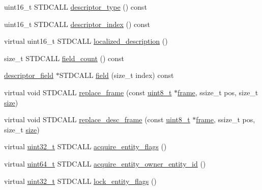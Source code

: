 \begin{DoxyCompactItemize}
\item 
uint16\+\_\+t S\+T\+D\+C\+A\+LL \hyperlink{classavdecc__lib_1_1descriptor__base__imp_aefc543029ab093823c3f5b9d84f0ccc4}{descriptor\+\_\+type} () const 
\item 
uint16\+\_\+t S\+T\+D\+C\+A\+LL \hyperlink{classavdecc__lib_1_1descriptor__base__imp_ac23c0a35276c07cfce8c8660700c2135}{descriptor\+\_\+index} () const 
\item 
virtual uint16\+\_\+t S\+T\+D\+C\+A\+LL \hyperlink{classavdecc__lib_1_1descriptor__base__imp_aa94307532fbb37e2f986fee8fec79373}{localized\+\_\+description} ()
\item 
size\+\_\+t S\+T\+D\+C\+A\+LL \hyperlink{classavdecc__lib_1_1descriptor__base__imp_a9b98d4f427a6c527e9080c938cfa9334}{field\+\_\+count} () const 
\item 
\hyperlink{classavdecc__lib_1_1descriptor__field}{descriptor\+\_\+field} $\ast$S\+T\+D\+C\+A\+LL \hyperlink{classavdecc__lib_1_1descriptor__base__imp_a5f8127d32e2aa54777ca03bf09e8d7b5}{field} (size\+\_\+t index) const 
\item 
virtual void S\+T\+D\+C\+A\+LL \hyperlink{classavdecc__lib_1_1descriptor__base__imp_a482fe95208e9e14885e28e73e7be2c49}{replace\+\_\+frame} (const \hyperlink{stdint_8h_aba7bc1797add20fe3efdf37ced1182c5}{uint8\+\_\+t} $\ast$\hyperlink{gst__avb__playbin_8c_ac8e710e0b5e994c0545d75d69868c6f0}{frame}, ssize\+\_\+t pos, size\+\_\+t \hyperlink{gst__avb__playbin_8c_a439227feff9d7f55384e8780cfc2eb82}{size})
\item 
virtual void S\+T\+D\+C\+A\+LL \hyperlink{classavdecc__lib_1_1descriptor__base__imp_a8dbf7d4faedf36ec789d33f228e22039}{replace\+\_\+desc\+\_\+frame} (const \hyperlink{stdint_8h_aba7bc1797add20fe3efdf37ced1182c5}{uint8\+\_\+t} $\ast$\hyperlink{gst__avb__playbin_8c_ac8e710e0b5e994c0545d75d69868c6f0}{frame}, ssize\+\_\+t pos, size\+\_\+t \hyperlink{gst__avb__playbin_8c_a439227feff9d7f55384e8780cfc2eb82}{size})
\item 
virtual \hyperlink{parse_8c_a6eb1e68cc391dd753bc8ce896dbb8315}{uint32\+\_\+t} S\+T\+D\+C\+A\+LL \hyperlink{classavdecc__lib_1_1descriptor__base__imp_a2d270d205bcea948cf61311a1f8336c6}{acquire\+\_\+entity\+\_\+flags} ()
\item 
virtual \hyperlink{parse_8c_aec6fcb673ff035718c238c8c9d544c47}{uint64\+\_\+t} S\+T\+D\+C\+A\+LL \hyperlink{classavdecc__lib_1_1descriptor__base__imp_a507b250a984bb5611d2699cd26d60a51}{acquire\+\_\+entity\+\_\+owner\+\_\+entity\+\_\+id} ()
\item 
virtual \hyperlink{parse_8c_a6eb1e68cc391dd753bc8ce896dbb8315}{uint32\+\_\+t} S\+T\+D\+C\+A\+LL \hyperlink{classavdecc__lib_1_1descriptor__base__imp_afe2564a2a32f83deced28efa17f332e2}{lock\+\_\+entity\+\_\+flags} ()

\end{DoxyCompactItemize}
